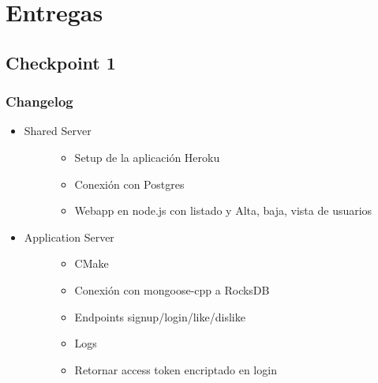 \documentclass[letterpaper,10pt,english]{sphinxmanual}
\begin{document}
\section{Entregas}
\label{manuals:entregas}

\subsection{Checkpoint 1}
\label{manuals:checkpoint-1}

\subsubsection{Changelog}
\label{manuals:changelog}\begin{itemize}
\item {} \begin{description}
\item[{Shared Server}] \leavevmode\begin{itemize}
\item {} 
Setup de la aplicación Heroku

\item {} 
Conexión con Postgres

\item {} 
Webapp en node.js con listado y Alta, baja, vista de usuarios

\end{itemize}

\end{description}

\item {} \begin{description}
\item[{Application Server}] \leavevmode\begin{itemize}
\item {} 
CMake

\item {} 
Conexión con mongoose-cpp a RocksDB

\item {} 
Endpoints signup/login/like/dislike

\item {} 
Logs

\item {} 
Retornar access token encriptado en login

\end{itemize}

\end{description}


\end{itemize}
\end{document}
